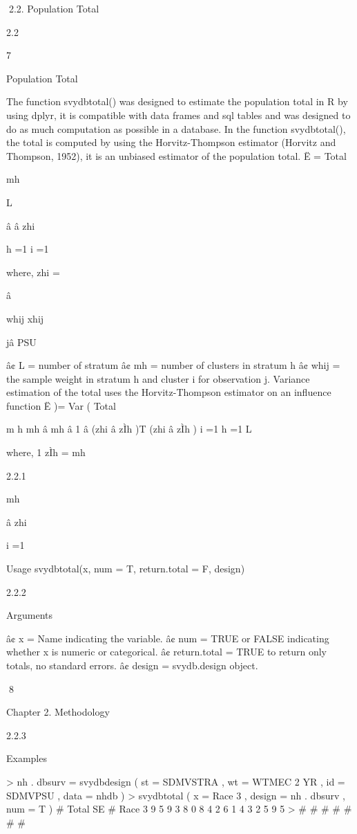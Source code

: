 2.2. Population Total

2.2

7

Population Total

The function svydbtotal() was designed to estimate the population total in R by
using dplyr, it is compatible with data frames and sql tables and was designed to do
as much computation as possible in a database.
In the function svydbtotal(), the total is computed by using the Horvitz-Thompson
estimator (Horvitz and Thompson, 1952), it is an unbiased estimator of the population total.
Ë =
Total

mh

L

â â zhi

h =1 i =1

where,
zhi =

â

whij xhij

jâ PSU

â¢ L = number of stratum
â¢ mh = number of clusters in stratum h
â¢ whij = the sample weight in stratum h and cluster i for observation j.
Variance estimation of the total uses the Horvitz-Thompson estimator on an influence function
Ë )=
Var ( Total

m h mh
â mh â 1 â (zhi â zÌh )T (zhi â zÌh )
i =1
h =1
L

where,
1
zÌh =
mh

2.2.1

mh

â zhi

i =1

Usage
svydbtotal(x, num = T, return.total = F, design)

2.2.2

Arguments

â¢ x = Name indicating the variable.
â¢ num = TRUE or FALSE indicating whether x is numeric or categorical.
â¢ return.total = TRUE to return only totals, no standard errors.
â¢ design = svydb.design object.

8

Chapter 2. Methodology

2.2.3

Examples

> nh . dbsurv = svydbdesign ( st = SDMVSTRA , wt = WTMEC 2 YR ,
id = SDMVPSU , data = nhdb )
> svydbtotal ( x = Race 3 , design = nh . dbsurv , num = T )
#
Total
SE
# Race 3 9 5 9 3 8 0 8 4 2 6 1 4 3 2 5 9 5
>
#
#
#
#
#
#
#

